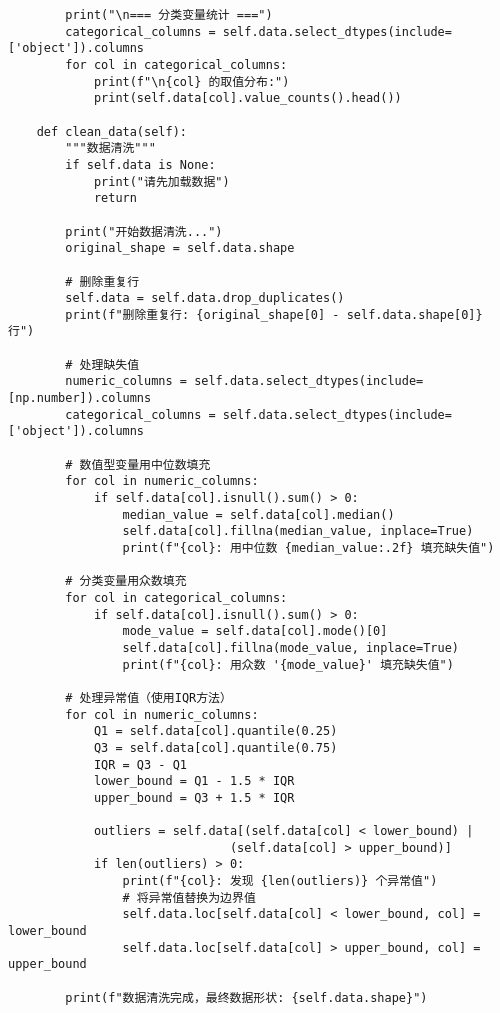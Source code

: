 \begin{codebox}[title=数据处理管道实现]
\begin{verbatim}
        print("\n=== 分类变量统计 ===")
        categorical_columns = self.data.select_dtypes(include=['object']).columns
        for col in categorical_columns:
            print(f"\n{col} 的取值分布:")
            print(self.data[col].value_counts().head())
    
    def clean_data(self):
        """数据清洗"""
        if self.data is None:
            print("请先加载数据")
            return
        
        print("开始数据清洗...")
        original_shape = self.data.shape
        
        # 删除重复行
        self.data = self.data.drop_duplicates()
        print(f"删除重复行: {original_shape[0] - self.data.shape[0]} 行")
        
        # 处理缺失值
        numeric_columns = self.data.select_dtypes(include=[np.number]).columns
        categorical_columns = self.data.select_dtypes(include=['object']).columns
        
        # 数值型变量用中位数填充
        for col in numeric_columns:
            if self.data[col].isnull().sum() > 0:
                median_value = self.data[col].median()
                self.data[col].fillna(median_value, inplace=True)
                print(f"{col}: 用中位数 {median_value:.2f} 填充缺失值")
        
        # 分类变量用众数填充
        for col in categorical_columns:
            if self.data[col].isnull().sum() > 0:
                mode_value = self.data[col].mode()[0]
                self.data[col].fillna(mode_value, inplace=True)
                print(f"{col}: 用众数 '{mode_value}' 填充缺失值")
        
        # 处理异常值（使用IQR方法）
        for col in numeric_columns:
            Q1 = self.data[col].quantile(0.25)
            Q3 = self.data[col].quantile(0.75)
            IQR = Q3 - Q1
            lower_bound = Q1 - 1.5 * IQR
            upper_bound = Q3 + 1.5 * IQR
            
            outliers = self.data[(self.data[col] < lower_bound) | 
                               (self.data[col] > upper_bound)]
            if len(outliers) > 0:
                print(f"{col}: 发现 {len(outliers)} 个异常值")
                # 将异常值替换为边界值
                self.data.loc[self.data[col] < lower_bound, col] = lower_bound
                self.data.loc[self.data[col] > upper_bound, col] = upper_bound
        
        print(f"数据清洗完成，最终数据形状: {self.data.shape}")
    

\end{verbatim}
\end{codebox}

